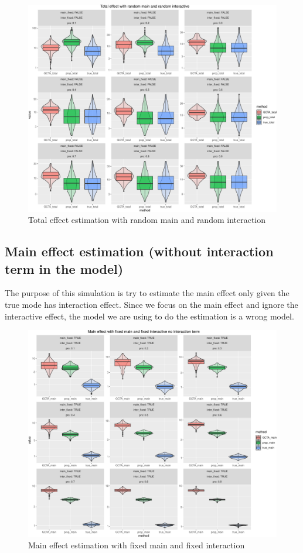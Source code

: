 \documentclass[]{article}
\begin{document}
\begin{figure}
\centering
\includegraphics{Simulation_report_files/figure-latex/Total effect random random 33-1.pdf}
\caption{Total effect estimation with random main and random
interaction}
\end{figure}

\newpage 

\subsection{Main effect estimation (without interaction term in the
model)}\label{main-effect-estimation-without-interaction-term-in-the-model}

The purpose of this simulation is try to estimate the main effect only
given the true mode has interaction effect. Since we focus on the main
effect and ignore the interactive effect, the model we are using to do
the estimation is a wrong model.

\begin{figure}
\centering
\includegraphics{Simulation_report_files/figure-latex/main effect fixed fixed without inter-1.pdf}
\caption{Main effect estimation with fixed main and fixed interaction}
\end{figure}
\end{document}
